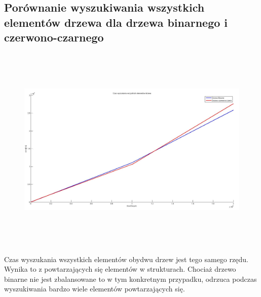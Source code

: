 \documentclass[a4paper,11pt]{article}
\begin{document}
\subsection{Porównanie wyszukiwania wszystkich elementów drzewa dla drzewa binarnego i czerwono-czarnego}
\begin{center}
\begin{figure}[h!]
\includegraphics[width=12.5cm,height=10cm]{Wykresy2/WszystkieElementyWyszukaj}
\label{fig:obrazek Wykresy2/WszystkieElementyWyszukaj}
\end{figure}
\end{center}
Czas wyszukania wszystkich elementów obydwu drzew jest tego samego rzędu. Wynika to z powtarzających się elementów w strukturach. Chociaż drzewo binarne nie jest zbalansowane to w tym konkretnym przypadku, odrzuca podczas wyszukiwania bardzo wiele elementów powtarzających się.
\newpage
\end{document}
